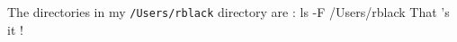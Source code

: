 \documentclass{article}
\begin{document}
The directories in my \texttt{/Users/rblack} directory are :
\bash[stdout]
ls -F /Users/rblack
\END
That 's it !
\end{document}
